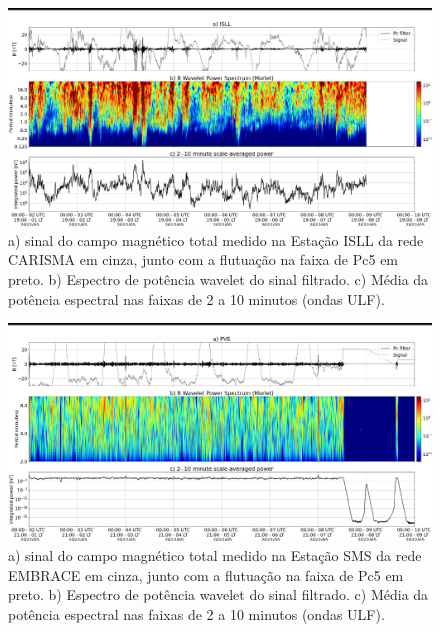 \documentclass[a4paper, 10pt]{article}
\begin{document}
\begin{figure}[H]
    
                        \centering
   
                             \includegraphics[width=14cm]{./figures//figureULF_0.png}

                             \caption{a) sinal do campo magnético total 
                              medido na Estação ISLL da rede CARISMA em cinza, 
                              junto com a flutuação na faixa de Pc5 em preto. b) 
                              Espectro de potência wavelet do sinal filtrado. c) 
                              Média da potência espectral nas faixas de 2 a 10 minutos 
                              (ondas ULF).}
                        \end{figure}

                     \begin{figure}[H]
    
                        \centering
   
                             \includegraphics[width=14cm]{./figures//figureULF_1.png}

                             \caption{a) sinal do campo magnético total medido 
                              na Estação SMS da rede EMBRACE em cinza, junto com a 
                              flutuação na faixa de Pc5 em preto. b) Espectro de potência 
                              wavelet do sinal filtrado. c) Média da potência espectral nas 
                              faixas de 2 a 10 minutos (ondas ULF).}
                        \end{figure}
\end{document}
